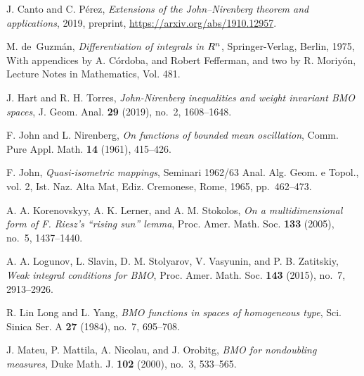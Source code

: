 \documentclass[11pt,a4paper]{amsart}
\theoremstyle{definition}
\theoremstyle{remark}
\numberwithin{equation}{section}
\numberwithin{equation}{section}
\begin{document}




\begin{thebibliography}{MMNO00}

J. Canto and C. P{\'e}rez, \emph{Extensions of the {J}ohn--{N}irenberg
  theorem and applications}, 2019, preprint,
  \url{https://arxiv.org/abs/1910.12957}.

M. de~Guzm{\'a}n, \emph{Differentiation of integrals in {$R\sp{n}$}},
  Springer-Verlag, Berlin, 1975, With appendices by A. C\'ordoba, and
  Robert Fefferman, and two by R. Moriy\'on, Lecture Notes in Mathematics,
  Vol. 481.

J. Hart and R. H. Torres, \emph{John-{N}irenberg inequalities and
  weight invariant {BMO} spaces}, J. Geom. Anal. \textbf{29} (2019), no.~2,
  1608--1648.

F. John and L. Nirenberg, \emph{On functions of bounded mean oscillation},
  Comm. Pure Appl. Math. \textbf{14} (1961), 415--426.

F. John, \emph{Quasi-isometric mappings}, Seminari 1962/63 {A}nal. {A}lg.
  {G}eom. e {T}opol., vol. 2, {I}st. {N}az. {A}lta {M}at, Ediz. Cremonese,
  Rome, 1965, pp.~462--473. 

A. A. Korenovskyy, A. K. Lerner, and A. M. Stokolos, \emph{On a
  multidimensional form of {F}. {R}iesz's ``rising sun'' lemma}, Proc. Amer.
  Math. Soc. \textbf{133} (2005), no.~5, 1437--1440.

A. A. Logunov, L. Slavin, D. M. Stolyarov, V. Vasyunin, and P. B. Zatitskiy,
  \emph{Weak integral conditions for {BMO}}, Proc. Amer. Math. Soc.
  \textbf{143} (2015), no.~7, 2913--2926. 

R. Lin Long and L. Yang, \emph{{BMO} functions in spaces of homogeneous type},
  Sci. Sinica Ser. A \textbf{27} (1984), no.~7, 695--708.

J. Mateu, P. Mattila, A. Nicolau, and J. Orobitg, \emph{B{MO} for nondoubling
  measures}, Duke Math. J. \textbf{102} (2000), no.~3, 533--565. 


\end{thebibliography}
\end{document}
